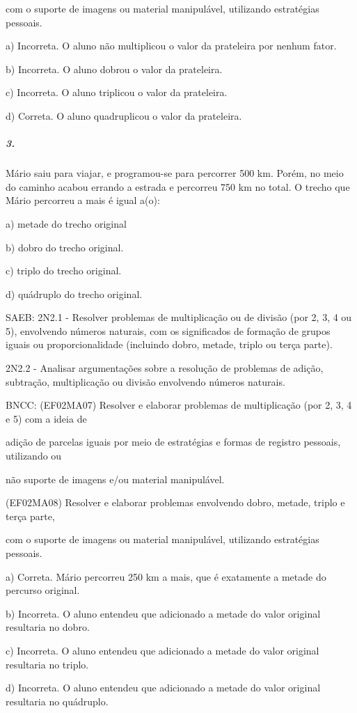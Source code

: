 com o suporte de imagens ou material manipulável, utilizando estratégias
pessoais.

a) Incorreta. O aluno não multiplicou o valor da prateleira por nenhum
fator.

b) Incorreta. O aluno dobrou o valor da prateleira.

c) Incorreta. O aluno triplicou o valor da prateleira.

d) Correta. O aluno quadruplicou o valor da prateleira.

\subparagraph{3.}\label{section-99}

Mário saiu para viajar, e programou-se para percorrer 500 km. Porém, no
meio do caminho acabou errando a estrada e percorreu 750 km no total. O
trecho que Mário percorreu a mais é igual a(o):

a) metade do trecho original

b) dobro do trecho original.

c) triplo do trecho original.

d) quádruplo do trecho original.

SAEB: 2N2.1 - Resolver problemas de multiplicação ou de divisão (por 2,
3, 4 ou 5), envolvendo números naturais, com os significados de formação
de grupos iguais ou proporcionalidade (incluindo dobro, metade, triplo
ou terça parte).

2N2.2 - Analisar argumentações sobre a resolução de problemas de adição,
subtração, multiplicação ou divisão envolvendo números naturais.

BNCC: (EF02MA07) Resolver e elaborar problemas de multiplicação (por 2,
3, 4 e 5) com a ideia de

adição de parcelas iguais por meio de estratégias e formas de registro
pessoais, utilizando ou

não suporte de imagens e/ou material manipulável.

(EF02MA08) Resolver e elaborar problemas envolvendo dobro, metade,
triplo e terça parte,

com o suporte de imagens ou material manipulável, utilizando estratégias
pessoais.

a) Correta. Mário percorreu 250 km a mais, que é exatamente a metade do
percurso original.

b) Incorreta. O aluno entendeu que adicionado a metade do valor original
resultaria no dobro.

c) Incorreta. O aluno entendeu que adicionado a metade do valor original
resultaria no triplo.

d) Incorreta. O aluno entendeu que adicionado a metade do valor original
resultaria no quádruplo.

